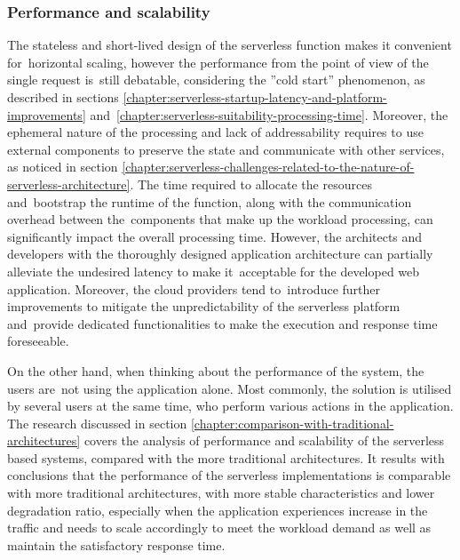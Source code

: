 \subsubsection{Performance and scalability} \label{chapter:serverless-suitability-performance-and-scalability}

The stateless and short-lived design of the serverless function makes it convenient for~horizontal scaling, however the performance from the point of view of the single request is~still debatable, considering the ''cold start'' phenomenon, as described in sections  \ref{chapter:serverless-startup-latency-and-platform-improvements} and~\ref{chapter:serverless-suitability-processing-time}.
Moreover, the ephemeral nature of the processing and lack of addressability requires to use external components to preserve the state and communicate with other services, as noticed in section \ref{chapter:serverless-challenges-related-to-the-nature-of-serverless-architecture}.
The time required to allocate the resources and~bootstrap the runtime of the function, along with the communication overhead between the~components that make up the workload processing, can significantly impact the overall processing time.
However, the architects and developers with the thoroughly designed application architecture can partially alleviate the undesired latency to make it~acceptable for the developed web application.
Moreover, the cloud providers tend to~introduce further improvements to mitigate the unpredictability of the serverless platform and~provide dedicated functionalities to make the execution and response time foreseeable.

On the other hand, when thinking about the performance of the system, the users are~not using the application alone.
Most commonly, the solution is utilised by several users at the same time, who perform various actions in the application.
The research discussed in section \ref{chapter:comparison-with-traditional-architectures} covers the analysis of performance and scalability of the serverless based systems, compared with the more traditional architectures.
It results with conclusions that the performance of the serverless implementations is comparable with more traditional architectures, with more stable characteristics and lower degradation ratio, especially when the application experiences increase in the traffic and needs to scale accordingly to meet the workload demand as well as maintain the satisfactory response time.

